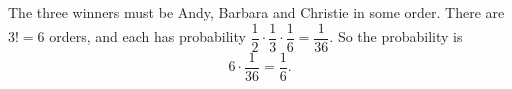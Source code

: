 The three winners must be Andy, Barbara and Christie in some order. There are $3!=6$ orders, and each has probability $\dfrac{1}{2}\cdot\dfrac{1}{3}\cdot\dfrac{1}{6}=\dfrac{1}{36}$. So the probability is
\[
6\cdot\dfrac{1}{36}=\boxed{\dfrac{1}{6}}.
\]
